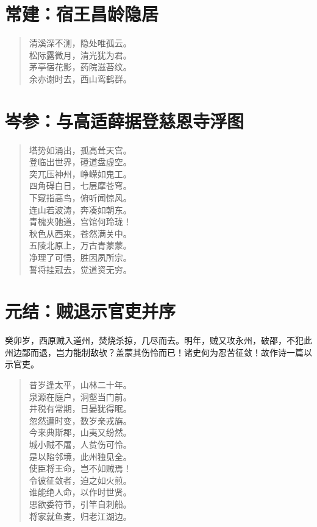 \documentclass[12pt,oneside]{book}
\newenvironment{shici}{%
\begin{verse}\centering\yanti\large\hspace{12pt}}{\end{verse}}
\begin{document}
\begin{common-format}
\chapter{常建：宿王昌龄隐居}
\begin{shici}
清溪深不测，隐处唯孤云。\\
松际露微月，清光犹为君。\\
茅亭宿花影，药院滋苔纹。\\
余亦谢时去，西山鸾鹤群。
\end{shici}

\chapter{岑参：与高适薛据登慈恩寺浮图}
\begin{shici}
塔势如涌出，孤高耸天宫。\\
登临出世界，磴道盘虚空。\\
突兀压神州，峥嵘如鬼工。\\
四角碍白日，七层摩苍穹。\\
下窥指高鸟，俯听闻惊风。\\
连山若波涛，奔凑如朝东。\\
青槐夹驰道，宫馆何玲珑！\\
秋色从西来，苍然满关中。\\
五陵北原上，万古青蒙蒙。\\
净理了可悟，胜因夙所宗。\\
誓将挂冠去，觉道资无穷。
\end{shici}

\chapter{元结：贼退示官吏并序}
癸卯岁，西原贼入道州，焚烧杀掠，几尽而去。明年，贼又攻永州，破邵，不犯此州边鄙而退，岂力能制敌欤？盖蒙其伤怜而已！诸史何为忍苦征敛！故作诗一篇以示官吏。

\begin{shici}
昔岁逢太平，山林二十年。\\
泉源在庭户，洞壑当门前。\\
井税有常期，日晏犹得眠。\\
忽然遭时变，数岁亲戎旃。\\
今来典斯郡，山夷又纷然。\\
城小贼不屠，人贫伤可怜。\\
是以陷邻境，此州独见全。\\
使臣将王命，岂不如贼焉！\\
令彼征敛者，迫之如火煎。\\
谁能绝人命，以作时世贤。\\
思欲委符节，引竿自刺船。\\
将家就鱼麦，归老江湖边。
\end{shici}



\end{common-format}
\end{document}
